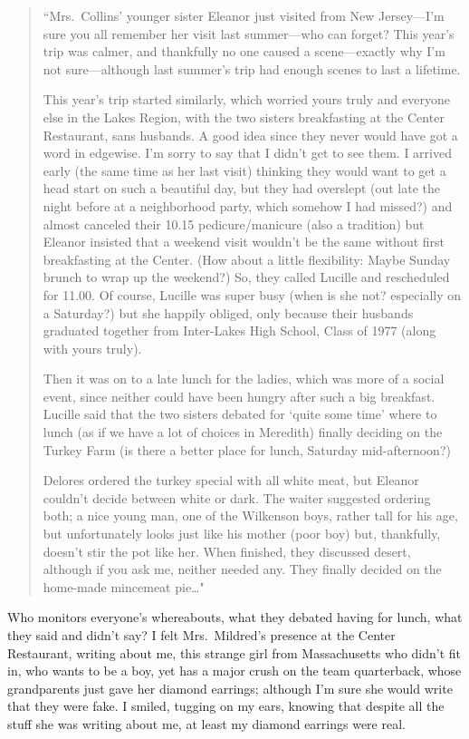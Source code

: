 \begin{quote}
``Mrs.~Collins' younger sister Eleanor just visited from New
Jersey---I'm sure you all remember her visit last summer---who can
forget? This year's trip was calmer, and thankfully no one caused a
scene---exactly why I'm not sure---although last summer's trip had
enough scenes to last a lifetime.

This year's trip started similarly, which worried yours truly and
everyone else in the Lakes Region, with the two sisters breakfasting at
the Center Restaurant, sans husbands. A good idea since they never would
have got a word in edgewise. I'm sorry to say that I didn't get to see
them. I arrived early (the same time as her last visit) thinking they
would want to get a head start on such a beautiful day, but they had
overslept (out late the night before at a neighborhood party, which
somehow I had missed?) and almost canceled their 10.15 pedicure/manicure
(also a tradition) but Eleanor insisted that a weekend visit wouldn't be
the same without first breakfasting at the Center. (How about a little
flexibility: Maybe Sunday brunch to wrap up the weekend?) So, they
called Lucille and rescheduled for 11.00. Of course, Lucille was super
busy (when is she not? especially on a Saturday?) but she happily
obliged, only because their husbands graduated together from Inter-Lakes
High School, Class of 1977 (along with yours truly).

Then it was on to a late lunch for the ladies, which was more of a
social event, since neither could have been hungry after such a big
breakfast. Lucille said that the two sisters debated for `quite some
time' where to lunch (as if we have a lot of choices in Meredith)
finally deciding on the Turkey Farm (is there a better place for lunch,
Saturday mid-afternoon?)

Delores ordered the turkey special with all white meat, but Eleanor
couldn't decide between white or dark. The waiter suggested ordering
both; a nice young man, one of the Wilkenson boys, rather tall for his
age, but unfortunately looks just like his mother (poor boy) but,
thankfully, doesn't stir the pot like her. When finished, they discussed
desert, although if you ask me, neither needed any. They finally decided
on the home-made mincemeat pie\ldots"
\end{quote}

\noindent Who monitors everyone's whereabouts, what they debated having
for lunch, what they said and didn't say? I felt Mrs.~Mildred's presence
at the Center Restaurant, writing about me, this strange girl from
Massachusetts who didn't fit in, who wants to be a boy, yet has a major
crush on the team quarterback, whose grandparents just gave her diamond
earrings; although I'm sure she would write that they were fake. I
smiled, tugging on my ears, knowing that despite all the stuff she was
writing about me, at least my diamond earrings were real.

